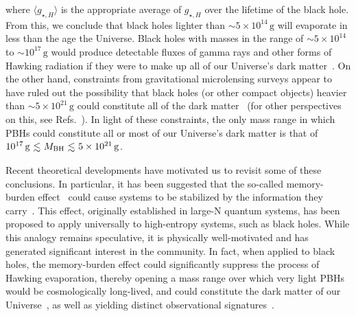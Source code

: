 where $\langle g_{\star, H} \rangle$ is the appropriate average of $g_{\star, H}$ over the lifetime of the black hole. From this, we conclude that black holes lighter than $\sim 5 \times 10^{14}\,\mathrm{g}$ will evaporate in less than the age the Universe. Black holes with masses in the range of $\sim 5 \times 10^{14}$ to $\sim 10^{17}\,\mathrm{g}$ would produce detectable fluxes of gamma rays and other forms of Hawking radiation if they were to make up all of our Universe's dark matter~\cite{Coogan:2020tuf, Boudaud:2018hqb, PhysRevD.101.123514, Keith:2021guq, Dasgupta:2019cae}. On the other hand, constraints from gravitational microlensing surveys appear to have ruled out the possibility that black holes (or other compact objects) heavier than $\sim 5 \times 10^{21}\,\mathrm{g}$ could constitute all of the dark matter~\cite{Macho:2000nvd, EROS-2:2006ryy, Griest:2013aaa, Oguri:2017ock, Niikura:2019kqi, Croon:2020ouk} (for other perspectives on this, see Refs.~\cite{Carr:2023tpt,Garcia-Bellido:2024yaz}). In light of these constraints, the only mass range in which PBHs could constitute all or most of our Universe's dark matter is that of $10^{17}\,\mathrm{g} \lsim M_\mathrm{BH} \lsim 5 \times 10^{21}\,\mathrm{g}$.

Recent theoretical developments have motivated us to revisit some of these conclusions. In particular, it has been suggested that the so-called memory-burden effect~\cite{Dvali:2018xpy, Dvali:2018ytn} could cause systems to be stabilized by the information they carry~\cite{Dvali:2020wft}. This effect, originally established in large-N quantum systems, has been proposed to apply universally to high-entropy systems, such as black holes. While this analogy remains speculative, it is physically well-motivated and has generated significant interest in the community. In fact, when applied to black holes, the memory-burden effect could significantly suppress the process of Hawking evaporation, thereby opening a mass range over which very light PBHs would be cosmologically long-lived, and could constitute the dark matter of our Universe~\cite{Dvali:2020wft, Alexandre:2024nuo, Dvali:2024hsb, Thoss:2024hsr},  as well as yielding distinct observational signatures~\cite{Zantedeschi:2024ram,Kohri:2024qpd,Barman:2024iht,Jiang:2024aju,Bhaumik:2024qzd}.

